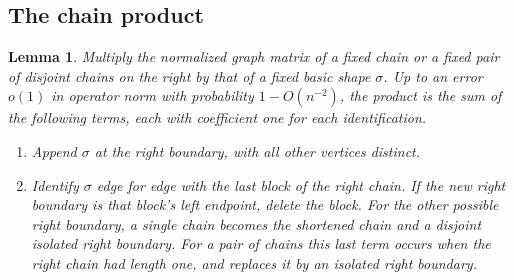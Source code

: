 \documentclass[11pt,letterpaper]{article}
\newtheorem{lemma}{Lemma}[section]
\begin{document}
\subsection{The chain product}

\begin{lemma}\label{lem:product}
Multiply the normalized graph matrix of a fixed chain or a fixed pair
of disjoint chains on the right by that of a fixed basic shape
\(\sigma\). Up to an error \(o(1)\) in operator norm with probability
\(1-O(n^{-2})\), the product is the sum of the following terms, each
with coefficient one for each identification.
\begin{enumerate}
\item Append \(\sigma\) at the right boundary, with all other vertices
      distinct.
\item Identify \(\sigma\) edge for edge with the last block of the right
      chain. If the new right boundary is that block's left endpoint,
      delete the block. For the other possible right boundary, a
      single chain becomes the shortened chain and a disjoint isolated
      right boundary. For a pair of chains this last term occurs when
      the right chain had length one, and replaces it by an isolated
      right boundary.
\end{enumerate}
\end{lemma}
\end{document}
